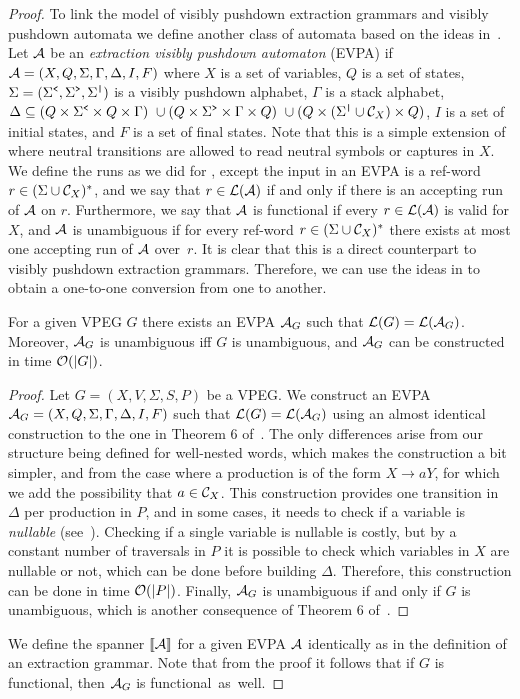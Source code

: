 
\begin{proof}
	
	To link the model of visibly pushdown extraction grammars and visibly pushdown automata we define another class of automata based on the ideas in~\cite{liatpaper}. Let $\mathcal{A}$ be an {\em extraction visibly pushdown automaton} (EVPA) if $\mathcal{A} = (X,Q,\Sigma,\Gamma,\Delta,I,F)$ where $X$ is a set of variables, $Q$ is a set of states, $\Sigma = (\Sigma^{\texttt{<}},\Sigma^{\texttt{>}},\Sigma^{\texttt{|}})$ is a visibly pushdown alphabet, $\Gamma$ is a stack alphabet, $\Delta \subseteq
	(Q \times \Sigma^{\texttt{<}} \times Q \times \Gamma) \ \cup (Q \times \Sigma^{\texttt{>}} \times \Gamma \times Q) \ \cup (Q \times (\Sigma^{\texttt{|}}\cup\mathcal{C}_{X}) \times Q)$, $I$ is a set of initial states, and $F$ is a set of final states. Note that this is a simple extension of \vpa where neutral transitions are allowed to read neutral symbols or captures in $X$. 
	We define the runs as we did for \vpa, except the input in an EVPA is a ref-word $r\in(\Sigma\cup\mathcal{C}_{X})^*$, and we say that $r\in\mathcal{L}(\mathcal{A})$ if and only if there is an accepting run of $\mathcal{A}$ on $r$. Furthermore, we say that $\mathcal{A}$ is functional if every $r\in\mathcal{L}(\mathcal{A})$ is valid for $X$, and $\mathcal{A}$ is unambiguous if for every ref-word $r\in (\Sigma\cup\mathcal{C}_{X})^*$ there exists at most one accepting run of $\mathcal{A}$ over~$r$. It is clear that this is a direct counterpart to visibly pushdown extraction grammars. Therefore, we can use the ideas in \cite{AlurM04} to obtain a one-to-one conversion from one to another.
	
	\begin{claim}\label{nested:appendix:spannerclaim}
		For a given VPEG $G$ there exists an EVPA $\mathcal{A}_G$ such that $\mathcal{L}(G) = \mathcal{L}(\mathcal{A}_G)$. Moreover, $\mathcal{A}_G$ is unambiguous iff $G$ is unambiguous, and $\mathcal{A}_G$ can be constructed in time $\mathcal{O}(\vert G\vert)$.
	\end{claim}
	\begin{proof}
		Let $G = (X, V, \Sigma, S, P)$ be a VPEG. We construct an EVPA $\mathcal{A}_G = (X,Q,\Sigma,\Gamma,\Delta,I,F)$ such that $\mathcal{L}(G) = \mathcal{L}(\mathcal{A}_G)$ using an almost identical construction to the one in Theorem 6 of~\cite{AlurM04}. The only differences arise from our structure being defined for well-nested words, which makes the construction a bit simpler, and from the case where a production is of the form $X\to aY$, for which we add the possibility that $a\in\mathcal{C}_{X}$. This construction provides one transition in $\Delta$ per production in $P$, and in some cases, it needs to check if a variable is {\it nullable} (see~\cite{AlurM04}). Checking if a single variable is nullable is costly, but by a constant number of traversals in $P$ it is possible to check which variables in $X$ are nullable or not, which can be done before building $\Delta$. Therefore, this construction can be done in time $\mathcal{O}(\vert P\vert)$. Finally, $\mathcal{A}_G$ is unambiguous if and only if $G$ is unambiguous, which is another consequence of Theorem 6 of~\cite{AlurM04}.	
	\end{proof}
	We define the spanner $\llbracket \mathcal{A} \rrbracket$ for a given EVPA $\mathcal{A}$ identically as in the definition of an extraction grammar. Note that from the proof it follows that if $G$ is functional, then $\mathcal{A}_G$ is functional~as~well.
	

\end{proof}
